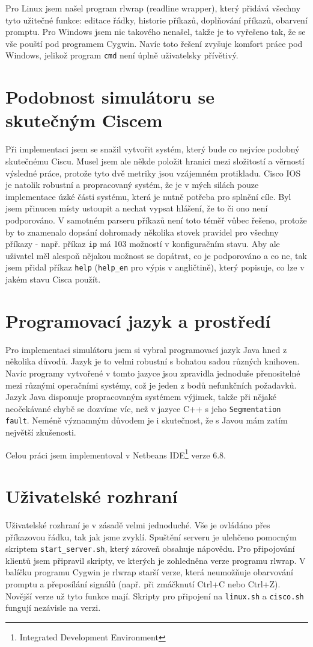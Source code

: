 Pro Linux jsem našel program rlwrap (readline wrapper), který přidává všechny tyto užitečné funkce: editace řádky, historie příkazů, doplňování příkazů, obarvení promptu. Pro Windows jsem nic takového nenašel, takže je to vyřešeno tak, že se vše pouští pod programem Cygwin. Navíc toto řešení zvyšuje komfort práce pod Windows, jelikož program \verb|cmd| není úplně uživatelsky přívětivý.


\section{Podobnost simulátoru se skutečným Ciscem}\label{kap:podobnost}
Při implementaci jsem se snažil vytvořit systém, který bude co nejvíce podobný skutečnému Ciscu. Musel jsem ale někde položit hranici mezi složitostí a věrností výsledné práce, protože tyto dvě metriky jsou vzájemném protikladu. Cisco IOS je natolik robustní a propracovaný systém, že je v mých silách pouze implementace úzké části systému, která je nutně potřeba pro splnění cíle. Byl jsem přinucen místy ustoupit a nechat vypsat hlášení, že to či ono není podporováno. V samotném parseru příkazů není toto téměř vůbec řešeno, protože by to znamenalo dopsání dohromady několika stovek pravidel pro všechny příkazy - např. příkaz \verb|ip| má 103 možností v konfiguračním stavu. Aby ale uživatel měl alespoň nějakou možnost se dopátrat, co je podporováno a co ne, tak jsem přidal příkaz \verb|help| (\verb|help_en| pro výpis v angličtině), který popisuje, co lze v jakém stavu Cisca použít.


\section{Programovací jazyk a prostředí}
Pro implementaci simulátoru jsem si vybral programovací jazyk Java hned z několika důvodů. Jazyk je to velmi robustní s bohatou sadou různých knihoven. Navíc programy vytvořené v tomto jazyce jsou zpravidla jednoduše přenositelné mezi různými operačními systémy, což je jeden z bodů nefunkčních požadavků. Jazyk Java disponuje propracovaným systémem výjimek, takže při nějaké neočekávané chybě se dozvíme víc, než v jazyce C++ s jeho \verb|Segmentation fault|. Neméně významným důvodem je i skutečnost, že s Javou mám zatím největší zkušenosti.

Celou práci jsem implementoval v Netbeans IDE\footnote{Integrated Development Environment} verze 6.8.


\section{Uživatelské rozhraní}
Uživatelské rozhraní je v zásadě velmi jednoduché. Vše je ovládáno přes příkazovou řádku, tak jak jsme zvyklí. Spuštění serveru je ulehčeno pomocným skriptem \verb|start_server.sh|, který zároveň obsahuje nápovědu. Pro připojování klientů jsem připravil skripty, ve kterých je zohledněna verze programu rlwrap. V balíčku programu Cygwin je rlwrap starší verze, která neumožňuje obarvování promptu a přeposílání signálů (např. při zmáčknutí Ctrl+C nebo Ctrl+Z). Novější verze už tyto funkce mají. Skripty pro připojení na \verb|linux.sh| a \verb|cisco.sh| fungují nezávisle na verzi.

